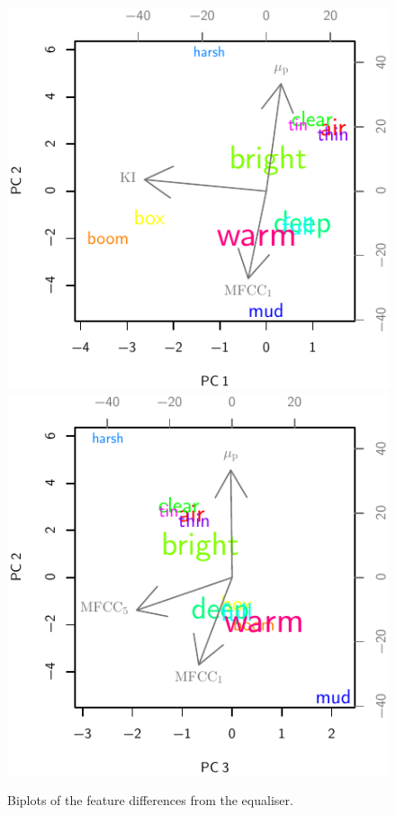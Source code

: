 			\begin{figure}[h!]
				\centering
				\subfloat
				{
					\includegraphics{chapter4/Images/EqualiserDifferenceCentroidsPCA1-2.pdf}
					\label{fig:EqualiserDifferenceCentroidsPCA1-2}
				}
				\quad
				\subfloat
				{
					\includegraphics{chapter4/Images/EqualiserDifferenceCentroidsPCA3-2.pdf}
					\label{fig:EqualiserDifferenceCentroidsPCA3-2}
				}
				\caption{Biplots of the feature differences from the equaliser.}
				\label{fig:EqualiserDifferenceCentroidsPCAs}
			\end{figure}
